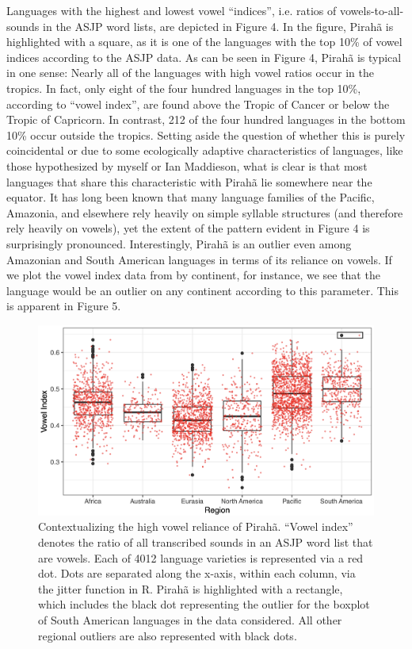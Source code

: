 \documentclass[output=paper,colorlinks,citecolor=brown
]{langscibook}
\begin{document}
    Languages with the highest and lowest vowel “indices”, i.e. ratios of vowels-to-all-sounds in the ASJP word lists, are depicted in Figure 4. In the figure, Pirahã is highlighted with a square, as it is one of the languages with the top 10\% of vowel indices according to the ASJP data. As can be seen in Figure 4, Pirahã is typical in one sense: Nearly all of the languages with high vowel ratios occur in the tropics. In fact, only eight of the four hundred languages in the top 10\%, according to “vowel index”, are found above the Tropic of Cancer or below the Tropic of Capricorn. In contrast, 212 of the four hundred languages in the bottom 10\% occur outside the tropics. Setting aside the question of whether this is purely coincidental or due to some ecologically adaptive characteristics of languages, like those hypothesized by myself or Ian Maddieson, what is clear is that most languages that share this characteristic with Pirahã lie somewhere near the equator. It has long been known that many language families of the Pacific, Amazonia, and elsewhere rely heavily on simple syllable structures (and therefore rely heavily on vowels), yet the extent of the pattern evident in Figure 4 is surprisingly pronounced. Interestingly, Pirahã is an outlier even among Amazonian and South American languages in terms of its reliance on vowels. If we plot the vowel index data from \cite{everett2017languages} by continent, for instance, we see that the language would be an outlier on any continent according to this parameter. This is apparent in Figure 5.

\begin{figure}
\centering
\includegraphics[width=1\textwidth]{everett_figure5.png}
\caption{\label{fig:Figure 5}Contextualizing the high vowel reliance of Pirahã. “Vowel index” denotes the ratio of all transcribed sounds in an ASJP word list that are vowels. Each of 4012 language varieties is represented via a red dot. Dots are separated along the x-axis, within each column, via the jitter function in R. Pirahã is highlighted with a rectangle, which includes the black dot representing the outlier for the boxplot of South American languages in the data considered. All other regional outliers are also represented with black dots.
}

\end{figure}
\end{document}
